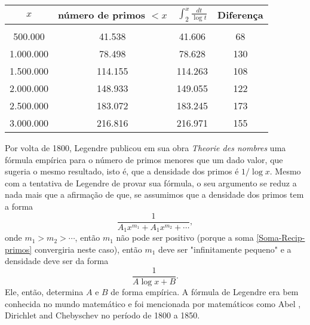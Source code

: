     \begin{table}[H]
        \centering
        \begin{tabular}{cccc}
             $x$& número de primos $< x$ & $\displaystyle \int_{2}^{x} \frac{dt}{\log t}$ &  Diferença\\[0.45cm]
             \hline\\[-0.3cm]
             500.000   & 41.538  & 41.606  & 68  \\[0.1cm]
             1.000.000 & 78.498  & 78.628  & 130 \\[0.1cm]
             1.500.000 & 114.155 & 114.263 & 108 \\[0.1cm]
             2.000.000 & 148.933 & 149.055 & 122 \\[0.1cm]
             2.500.000 & 183.072 & 183.245 & 173 \\[0.1cm]
             3.000.000 & 216.816 & 216.971 & 155
        \end{tabular}
        \caption{}
        \label{Tabela-Lehmer}
    \end{table}
    
    Por volta de 1800, Legendre publicou em sua obra \textit{Theorie des nombres} \cite{legendre1830} uma fórmula empírica para o número de primos menores que um dado valor, que sugeria o mesmo resultado, isto é, que a densidade dos primos é $1/\log x$. Mesmo com a tentativa de Legendre de provar sua fórmula, o seu argumento se reduz a nada mais que a afirmação de que, se assumimos que a densidade dos primos tem a forma
    $$\frac{1}{A_1x^{m_1} + A_1x^{m_2} + \cdots},$$
    onde $m_1 > m_2> \cdots$, então $m_1$ não pode ser positivo (porque a soma \eqref{Soma-Recip-primos} convergiria neste caso), então $m_1$ deve ser "infinitamente pequeno" e a densidade deve ser da forma
    $$\frac{1}{A \log x + B}.$$
    Ele, então, determina $A$ e $B$ de forma empírica. A fórmula de 
    Legendre era bem conhecida no mundo matemático e foi mencionada por matemáticos como Abel \cite{Abel-Holmboe}, Dirichlet \cite{Dirichlet38} 
    and Chebyschev \cite{Chebyshev52} no período de 1800 a 1850.
    
